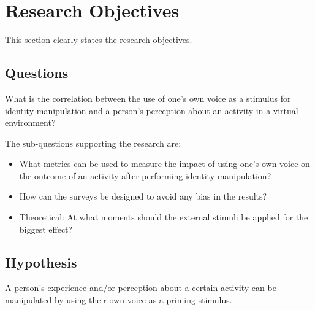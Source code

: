 \documentclass[Research.tex]{subfiles}
\begin{document}
\chapter{Research Objectives}

This section clearly states the research objectives.

\section{Questions}
What is the correlation between the use of one’s own voice as a stimulus for identity manipulation and a person's perception about an activity in a virtual environment?

The sub-questions supporting the research are:

\begin{itemize}

\item What metrics can be used to measure the impact of using one’s own voice on the outcome of an activity after performing identity manipulation?
\item How can the surveys be designed to avoid any bias in the results?
\item Theoretical: At what moments should the external stimuli be applied for the biggest effect?

\end{itemize}

\section{Hypothesis}

A person’s experience and/or perception about a certain activity can be manipulated by using their own voice as a priming stimulus.
\end{document}
